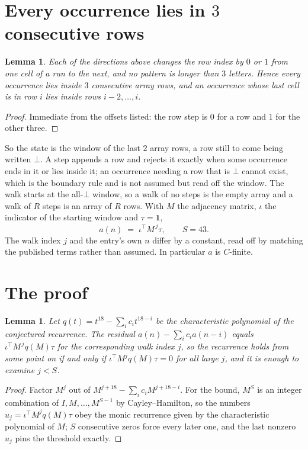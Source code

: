 \documentclass[11pt,a4paper]{article}
\theoremstyle{plain}
\newtheorem{lemma}[theorem]{Lemma}
\theoremstyle{definition}
\begin{document}
\section{Every occurrence lies in $3$ consecutive rows}

\begin{lemma}\label{lem:win}
Each of the directions above changes the row index by $0$ or $1$ from one cell of a run to the
next, and no pattern is longer than $3$ letters. Hence every occurrence lies inside $3$
consecutive array rows, and an occurrence whose last cell is in row $i$ lies inside rows
$i-2,\dots,i$.
\end{lemma}

\begin{proof}
Immediate from the offsets listed: the row step is $0$ for a row and $1$ for the other three.
\end{proof}

So the state is the window of the last $2$ array rows, a row still to come being written
$\bot$. A step appends a row and rejects it exactly when some occurrence ends in it or lies
inside it; an occurrence needing a row that is $\bot$ cannot exist, which is the boundary rule
and is not assumed but read off the window. The walk starts at the all-$\bot$ window, so a walk
of no steps is the empty array and a walk of $R$ steps is an array of $R$ rows. With $M$ the
adjacency matrix, $\iota$ the indicator of the starting window and $\tau=\mathbf{1}$,
\[
a(n)\;=\;\iota^{\!\top}M^{\,j}\tau ,\qquad S=43.
\]
The walk index $j$ and the entry's own $n$ differ by a constant, read off by matching the
published terms rather than assumed. In particular $a$ is $C$-finite.

\section{The proof}

\begin{lemma}\label{lem:crit}
Let $q(t)=t^{18}-\sum_i c_it^{18-i}$ be the characteristic polynomial of the
conjectured recurrence. The residual $a(n)-\sum_ic_ia(n-i)$ equals
$\iota^{\!\top}M^{\,j}q(M)\tau$ for the corresponding walk index $j$, so the recurrence
holds from some point on if and only if $\iota^{\!\top}M^{j}q(M)\tau=0$ for all large $j$,
and it is enough to examine $j<S$.
\end{lemma}

\begin{proof}
Factor $M^{j}$ out of $M^{j+18}-\sum_ic_iM^{j+18-i}$. For the bound, $M^{S}$
is an integer combination of $I,M,\dots,M^{S-1}$ by Cayley--Hamilton, so the numbers
$u_j=\iota^{\!\top}M^{j}q(M)\tau$ obey the monic recurrence given by the characteristic
polynomial of $M$; $S$ consecutive zeros force every later one, and the last nonzero $u_j$
pins the threshold exactly.
\end{proof}
\end{document}
